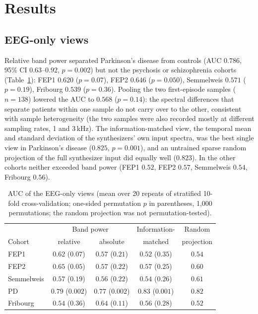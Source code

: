 \section{Results}\label{section:results}

\subsection{EEG-only views}\label{section:res_eeg}

Relative band power separated Parkinson's disease from controls (AUC $0.786$, 95\% CI $0.63$--$0.92$, $p=0.002$) but not the psychosis or schizophrenia cohorts (Table~\ref{tab:eeg}): FEP1 $0.620$ ($p=0.07$), FEP2 $0.646$ ($p=0.050$), Semmelweis $0.571$ ($p=0.19$), Fribourg $0.539$ ($p=0.36$). Pooling the two first-episode samples ($n=138$) lowered the AUC to $0.568$ ($p=0.14$): the spectral differences that separate patients within one sample do not carry over to the other, consistent with sample heterogeneity (the two samples were also recorded mostly at different sampling rates, 1 and 3\,kHz). The information-matched view, the temporal mean and standard deviation of the synthesizers' own input spectra, was the best single view in Parkinson's disease ($0.825$, $p=0.001$), and an untrained sparse random projection of the full synthesizer input did equally well ($0.823$). In the other cohorts neither exceeded band power (FEP1 $0.52$, FEP2 $0.57$, Semmelweis $0.54$, Fribourg $0.56$).

\begin{table}[!htbp]
    \centering
    \caption{AUC of the EEG-only views (mean over 20 repeats of stratified 10-fold cross-validation; one-sided permutation $p$ in parentheses, 1,000 permutations; the random projection was not permutation-tested).}
    \label{tab:eeg}
    \footnotesize\setlength{\tabcolsep}{4pt}
    \begin{tabular}{@{}l c c c c@{}}
        \hline
        & \multicolumn{2}{c}{Band power} & Information- & Random \\
        Cohort & relative & absolute & matched & projection \\
        \hline
        FEP1 & $0.62$ ($0.07$) & $0.57$ ($0.21$) & $0.52$ ($0.35$) & $0.54$ \\
        FEP2 & $0.65$ ($0.05$) & $0.57$ ($0.22$) & $0.57$ ($0.25$) & $0.60$ \\
        Semmelweis & $0.57$ ($0.19$) & $0.56$ ($0.22$) & $0.54$ ($0.26$) & $0.61$ \\
        PD & $0.79$ ($0.002$) & $0.77$ ($0.002$) & $0.83$ ($0.001$) & $0.82$ \\
        Fribourg & $0.54$ ($0.36$) & $0.64$ ($0.11$) & $0.56$ ($0.28$) & $0.52$ \\
        \hline
    \end{tabular}
\end{table}

